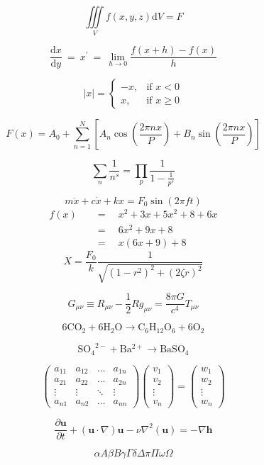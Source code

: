 \documentclass[12pt]{article}
\begin{document}

$$\iiint\limits_{V}f(x,y,z){\mathrm{d}}V = F$$

$$\frac{{\mathrm{d}}x}{{\mathrm{d}}y}\ =\ x^{\prime}\ =\ \lim\limits_{h\to 0} \frac{f(x+h)-f(x)}{h}$$

\[|x|=\begin{cases}
-x, & \text{if $x<0$} \\
x, & \text{if $x \geq 0$}
\end{cases}\]

$$F(x)=A_0+\sum_{n=1}^N\left[A_n\cos\left(\frac{2\pi nx}{P}\right)+B_n\sin\left(\frac{2\pi nx}{P}\right)\right]$$

$$\sum_n \frac{1}{n^s} = \prod_p \frac{1}{1-\frac{1}{p^s}}$$

$$m\ddot{x} +c\dot{x} +kx= F_0\sin(2\pi ft)$$
\begin{align*}
f(x)\quad &=\quad x^2+3x+5x^2+8+6x\\
&=\quad 6x^2+9x+8\\
&=\quad x(6x+9)+8
\end{align*}
$$X=\frac{F_0}{k}\frac{1}{\sqrt{(1-r^2)^2+(2\zeta r)^2}}$$

$$G_{\mu\nu}\equiv R_{\mu\nu}-\frac{1}{2}Rg_{\mu\nu}=\frac{8\pi G}{c^4}T_{\mu\nu}$$

$$\mathrm{6CO_2 + 6H_2O \rightarrow C_6H_{12}O_6 + 6O_2}$$

$$\mathrm{{SO_4}^{2-}+Ba^{2+} \rightarrow BaSO_4}$$

\[
\begin{pmatrix}
{a_{11}} & {a_{12}} & \dots & {a_{1n}} \\
{a_{21}} & {a_{22}} & \dots & {a_{2n}} \\
 \vdots &\vdots & \ddots &\vdots\\
{a_{n1}} & {a_{n2}} & \dots & {a_{nn}}
\end{pmatrix}
\begin{pmatrix}
{v_1}\\
{v_2}\\
 \vdots\\
{v_n}
\end{pmatrix}
=
\begin{pmatrix}
{w_1}\\
{w_2}\\
 \vdots\\
{w_n}
\end{pmatrix}
\]

$$\frac{\partial{\mathrm{\textbf{u}}}}{\partial t} + ({\mathrm{\textbf{u}}}\cdot\nabla){\mathrm{\textbf{u}}}-\nu\nabla^2({\mathrm{\textbf{u}}})=-\nabla {\mathrm{\textbf{h}}}$$

$$\alpha A\beta B\gamma\Gamma\delta\Delta\pi\Pi\omega\Omega$$

\end{document}
